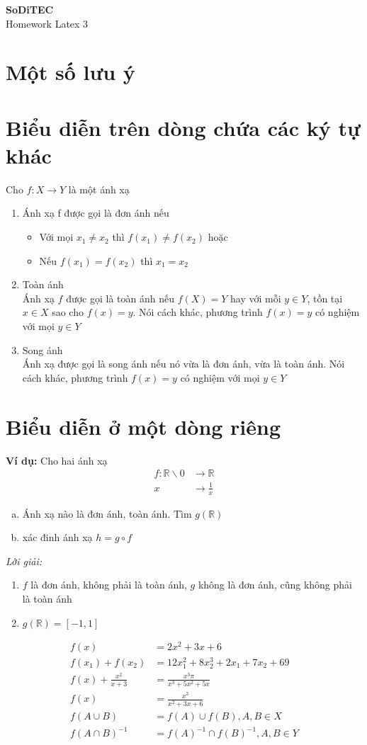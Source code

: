 \documentclass[11pt, a4paper]{article}
\begin{document}
	\begin{center}
		{\color{red} \bfseries \Large
		SoDiTEC\\}
		Homework Latex 3
	\end{center}
	\section{Một số lưu ý}
	\section{Biểu diễn trên dòng chứa các ký tự khác}
	Cho \(f: X \rightarrow Y\) là một ánh xạ
	\begin{enumerate}[1.]
		\item Ánh xạ f được gọi là đơn ánh nếu
		\begin{itemize}
			\item Với mọi \(x_1 \neq x_2\) thì \(f(x_1) \neq f(x_2)\) hoặc
			\item Nếu \(f(x_1) = f(x_2) \) thì \( x_1 = x_2\)
		\end{itemize}
		\item Toàn ánh\\
		Ánh xạ \(f\) được gọi là toàn ánh nếu \(f(X) = Y\) hay với mỗi \(y \in Y\), tồn tại \(x\in X\) sao cho \(f(x)=y\). Nói cách khác, phương trình \(f(x)=y\) có nghiệm với mọi \(y\in Y\)
		\item Song ánh\\
		Ánh xạ được gọi là song ánh nếu nó vừa là đơn ánh, vừa là toàn ánh. Nói cách khác, phương trình \(f(x) = y\) có nghiệm với mọi \(y\in Y\)
	\end{enumerate}
	\section{Biểu diễn ở một dòng riêng}
	\textbf{Ví dụ:} Cho hai ánh xạ
	\begin{align*}
		f:\mathbb{R}\backslash 0 &\rightarrow \mathbb{R}\\
		x &\rightarrow \frac{1}{x}
	\end{align*}
	\begin{enumerate}[a)]
		\item Ánh xạ nào là đơn ánh, toàn ánh. Tìm \(g(\mathbb{R})\)
		\item xác đinh ánh xạ \(h=g \circ f\)
	\end{enumerate}
	\textit{Lời giải:}
	\begin{enumerate}
		\item \(f\) là đơn ánh, không phải là toàn ánh, \(g\) không là đơn ánh, cũng không phải là toàn ánh
		\item \(g(\mathbb{R})=\left[-1,1\right]\)
	\end{enumerate}
	\begin{align}
		f(x) &= 2x^2+3x+6\\
		f(x_1) + f(x_2) &= 12x_1^2+8x_2^3+2x_1+7x_2+69\\
		f(x) + \frac{x^2}{x+3} &= \frac{x^3\pi}{x^3+5x^2+5x}\\
		f(x)&=\frac{x^3}{x^2+3x+6}\\
		f(A\cup B) &= f(A)\cup f(B), A, B \in X\\
		f(A\cap B)^{-1} &= f(A)^{-1}\cap f(B)^{-1}, A, B \in Y
	\end{align}
\end{document}
